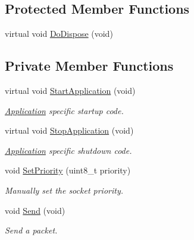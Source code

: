 \subsection*{Protected Member Functions}
\begin{DoxyCompactItemize}
\item 
virtual void \hyperlink{classns3_1_1PacketSocketClient_a2a3799f42514d3ca607143add4cab8c2}{Do\+Dispose} (void)
\end{DoxyCompactItemize}
\subsection*{Private Member Functions}
\begin{DoxyCompactItemize}
\item 
virtual void \hyperlink{classns3_1_1PacketSocketClient_a51fe7978d43291735b363a7060512c37}{Start\+Application} (void)
\begin{DoxyCompactList}\small\item\em \hyperlink{classns3_1_1Application}{Application} specific startup code. \end{DoxyCompactList}\item 
virtual void \hyperlink{classns3_1_1PacketSocketClient_ac5a664a8c6265dafd8e45b5897d27545}{Stop\+Application} (void)
\begin{DoxyCompactList}\small\item\em \hyperlink{classns3_1_1Application}{Application} specific shutdown code. \end{DoxyCompactList}\item 
void \hyperlink{classns3_1_1PacketSocketClient_a93229ac3c07d5e6a049d515a684cc15a}{Set\+Priority} (uint8\+\_\+t priority)
\begin{DoxyCompactList}\small\item\em Manually set the socket priority. \end{DoxyCompactList}\item 
void \hyperlink{classns3_1_1PacketSocketClient_ad3a4b71574d311bbc927ec46dc52abd0}{Send} (void)
\begin{DoxyCompactList}\small\item\em Send a packet. \end{DoxyCompactList}\end{DoxyCompactItemize}
